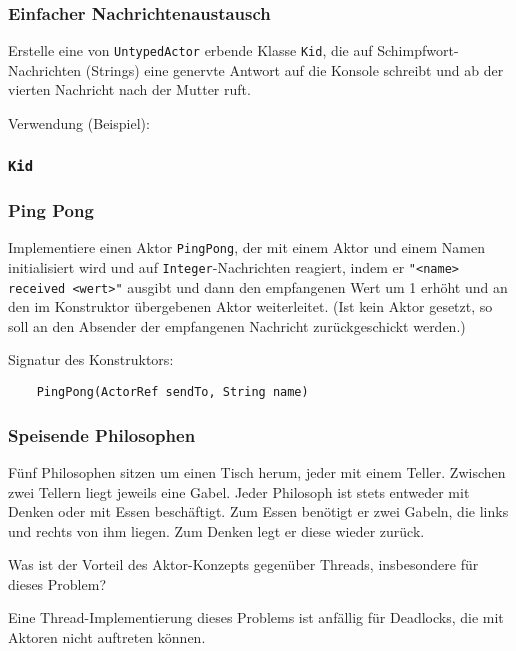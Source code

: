 \documentclass{beamer}
\date{2017-02-06}
\begin{document}
\normalsize
\normalem

\lstset{language=Java}

\begin{frame}[plain]
  \titlepage
\end{frame}

\begin{frame}
  \frametitle{Einfacher Nachrichtenaustausch}
  Erstelle eine von \lstinline{UntypedActor} erbende Klasse \lstinline{Kid},
  die auf Schimpfwort-Nachrichten (Strings) eine genervte Antwort auf die Konsole schreibt
  und ab der vierten Nachricht nach der Mutter ruft.
  
  Verwendung (Beispiel):
  
\end{frame}

\begin{frame}
  \frametitle{\lstinline{Kid}}
  
\end{frame}

\begin{frame}[fragile]
  \frametitle{Ping Pong}
  Implementiere einen Aktor \lstinline{PingPong},
  der mit einem Aktor und einem Namen initialisiert wird
  und auf \lstinline{Integer}-Nachrichten reagiert,
  indem er \lstinline{"<name> received <wert>"} ausgibt
  und dann den empfangenen Wert um 1 erhöht
  und an den im Konstruktor übergebenen Aktor weiterleitet.
  (Ist kein Aktor gesetzt,
  so soll an den Absender der empfangenen Nachricht zurückgeschickt werden.)
  
  Signatur des Konstruktors:
  \begin{lstlisting}
    PingPong(ActorRef sendTo, String name)
  \end{lstlisting}
\end{frame}

\begin{frame}
  \frametitle{Speisende Philosophen}
  Fünf Philosophen sitzen um einen Tisch herum,
  jeder mit einem Teller.
  Zwischen zwei Tellern liegt jeweils eine Gabel.
  Jeder Philosoph ist stets entweder mit Denken oder mit Essen beschäftigt.
  Zum Essen benötigt er zwei Gabeln, die links und rechts von ihm liegen.
  Zum Denken legt er diese wieder zurück.
  
  Was ist der Vorteil des Aktor-Konzepts gegenüber Threads,
  insbesondere für dieses Problem?
  
  \pause
  Eine Thread-Implementierung dieses Problems ist anfällig für Deadlocks,
  die mit Aktoren nicht auftreten können.
\end{frame}
\end{document}

